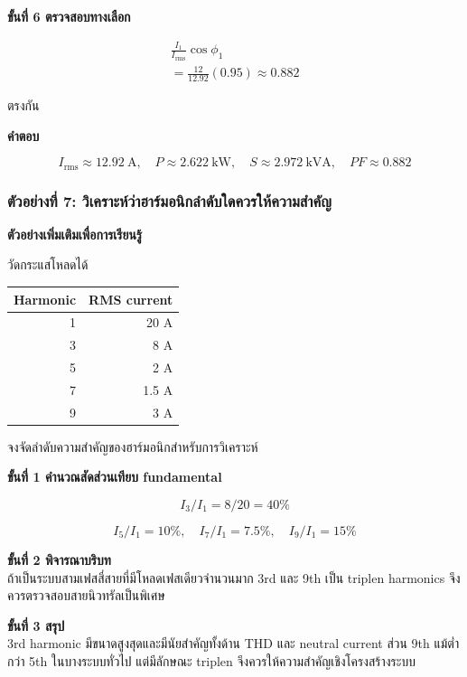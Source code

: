 \textbf{ขั้นที่ 6 ตรวจสอบทางเลือก}

\[
\begin{aligned}
    \frac{I_1}{I_{\mathrm{rms}}}\cos\phi_1 \\
    =\frac{12}{12.92}(0.95)\approx0.882
\end{aligned}
\]

ตรงกัน

\textbf{คำตอบ}

\[
\boxed{I_{\mathrm{rms}}\approx12.92\ \text{A},\quad P\approx2.622\ \text{kW},\quad S\approx2.972\ \text{kVA},\quad PF\approx0.882}
\]

\subsubsection{ตัวอย่างที่ 7: วิเคราะห์ว่าฮาร์มอนิกลำดับใดควรให้ความสำคัญ}

\textbf{ตัวอย่างเพิ่มเติมเพื่อการเรียนรู้}

วัดกระแสโหลดได้

\begin{table}[htbp]
    \centering
    \begin{tabular}{r r}
        \hline
        \textbf{Harmonic} & \textbf{RMS current} \\
        \hline
        1 & 20 A \\
        3 & 8 A \\
        5 & 2 A \\
        7 & 1.5 A \\
        9 & 3 A \\
        \hline
    \end{tabular}
\end{table}

จงจัดลำดับความสำคัญของฮาร์มอนิกสำหรับการวิเคราะห์

\textbf{ขั้นที่ 1 คำนวณสัดส่วนเทียบ fundamental}

\[
I_3/I_1=8/20=40\%
\]

\[
I_5/I_1=10\%,\quad I_7/I_1=7.5\%,\quad I_9/I_1=15\%
\]

\textbf{ขั้นที่ 2 พิจารณาบริบท} \\
ถ้าเป็นระบบสามเฟสสี่สายที่มีโหลดเฟสเดียวจำนวนมาก 3rd และ 9th เป็น triplen harmonics จึงควรตรวจสอบสายนิวทรัลเป็นพิเศษ

\textbf{ขั้นที่ 3 สรุป} \\
3rd harmonic มีขนาดสูงสุดและมีนัยสำคัญทั้งด้าน THD และ neutral current ส่วน 9th แม้ต่ำกว่า 5th ในบางระบบทั่วไป แต่มีลักษณะ triplen จึงควรให้ความสำคัญเชิงโครงสร้างระบบ

